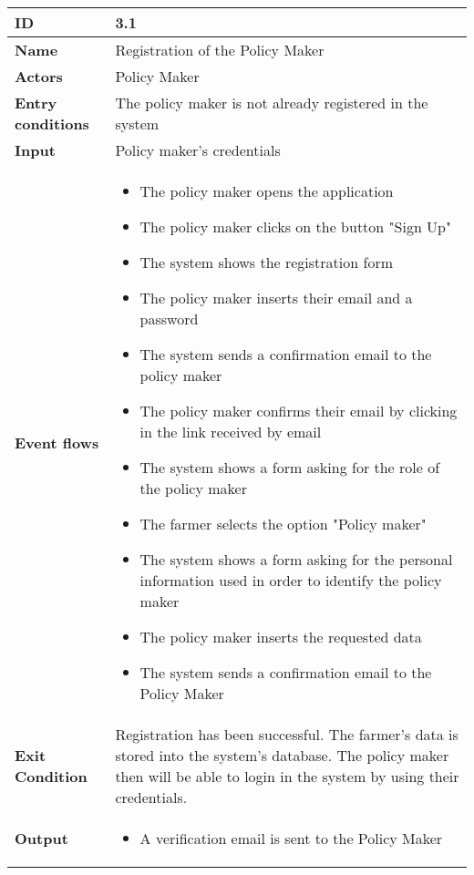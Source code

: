 \begin{longtable}[H]{ | l | p{10cm} | }
\hline
{\cellcolor[rgb]{0.753,0.753,0.753}} \textbf{ID}  & 3.1 \\ \hline
{\cellcolor[rgb]{0.753,0.753,0.753}} \textbf{Name} & Registration of the Policy Maker \\ \hline
{\cellcolor[rgb]{0.753,0.753,0.753}}\textbf{Actors} & Policy Maker \\ \hline
{\cellcolor[rgb]{0.753,0.753,0.753}}\textbf{Entry conditions} & The policy maker is not already registered in the system \\ \hline
{\cellcolor[rgb]{0.753,0.753,0.753}}\textbf{Input} & Policy maker's credentials \\ \hline
{\cellcolor[rgb]{0.753,0.753,0.753}}\textbf{Event flows} &
\begin{itemize}
    \item The policy maker opens the application
    \item The policy maker clicks on the button "Sign Up"
    \item The system shows the registration form
    \item The policy maker inserts their email and a password
    \item The system sends a confirmation email to the policy maker
    \item The policy maker confirms their email by clicking in the link received by email
    \item The system shows a form asking for the role of the policy maker
    \item The farmer selects the option "Policy maker"
    \item The system shows a form asking for the personal information used in order to identify the policy maker
    \item The policy maker inserts the requested data
    \item The system sends a confirmation email to the Policy Maker
\end{itemize}
\\ \hline
{\cellcolor[rgb]{0.753,0.753,0.753}}\textbf{Exit Condition} & Registration has been successful. The farmer's data is stored into the system's database. The policy maker then will be able to login in the system by using their credentials.\\ \hline
{\cellcolor[rgb]{0.753,0.753,0.753}}\textbf{Output} & 
\begin{itemize}
    \item A verification email is sent to the Policy Maker

\end{itemize}
\end{longtable}
